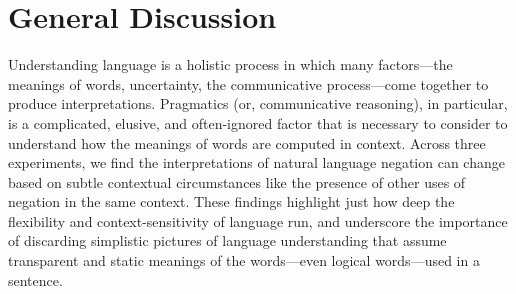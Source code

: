 \documentclass[floatsintext,doc]{apa6}
\newcommand{\ourmodel}{Flexible Negation\xspace}
\begin{document}
\section{General Discussion}\label{discussion}


Understanding language is a holistic process in which many factors---the meanings of words, uncertainty, the communicative process---come together to produce interpretations. Pragmatics (or, communicative reasoning), in particular, is a complicated, elusive, and often-ignored factor that is necessary to consider to understand how the meanings of words are computed in context. 
Across three experiments, we find the interpretations of natural language negation can change based on subtle contextual circumstances like the presence of other uses of negation in the same context.
These findings highlight just how deep the flexibility and context-sensitivity of language run, and underscore the importance of discarding simplistic pictures of language understanding that assume transparent and static meanings of the words---even logical words---used in a sentence. 

\end{document}

